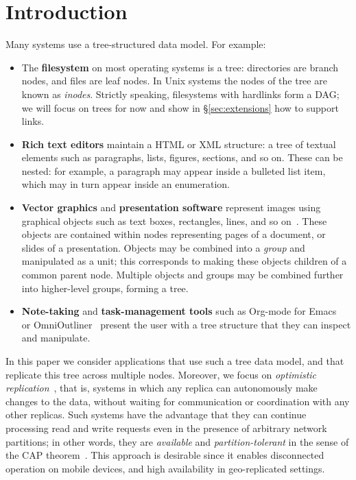\documentclass[sigplan,anonymous]{acmart}
\begin{document}
\maketitle

\section{Introduction}\label{sec:intro}

Many systems use a tree-structured data model.
For example:
\begin{itemize}
    \item The \textbf{filesystem} on most operating systems is a tree: directories are branch nodes, and files are leaf nodes.
        In Unix systems the nodes of the tree are known as \emph{inodes}.
        Strictly speaking, filesystems with hardlinks form a DAG; we will focus on trees for now and show in \S\ref{sec:extensions} how to support links.
    \item \textbf{Rich text editors} maintain a HTML or XML structure: a tree of textual elements such as paragraphs, lists, figures, sections, and so on.
        These can be nested: for example, a paragraph may appear inside a bulleted list item, which may in turn appear inside an enumeration.
    \item \textbf{Vector graphics} and \textbf{presentation software} represent images using graphical objects such as text boxes, rectangles, lines, and so on~\cite{Wallace:2019vf}.
        These objects are contained within nodes representing pages of a document, or slides of a presentation.
        Objects may be combined into a \emph{group} and manipulated as a unit; this corresponds to making these objects children of a common parent node.
        Multiple objects and groups may be combined further into higher-level groups, forming a tree.
    \item \textbf{Note-taking} and \textbf{task-management tools} such as Org-mode for Emacs~\cite{OrgMode} or OmniOutliner~\cite{OmniOutliner} present the user with a tree structure that they can inspect and manipulate.
\end{itemize}

In this paper we consider applications that use such a tree data model, and that replicate this tree across multiple nodes.
Moreover, we focus on \emph{optimistic replication}~\cite{Saito:2005jw}, that is, systems in which any replica can autonomously make changes to the data, without waiting for communication or coordination with any other replicas.
Such systems have the advantage that they can continue processing read and write requests even in the presence of arbitrary network partitions; in other words, they are \emph{available} and \emph{partition-tolerant} in the sense of the CAP theorem~\cite{Gilbert:2002il}.
This approach is desirable since it enables disconnected operation on mobile devices, and high availability in geo-replicated settings.
\end{document}
